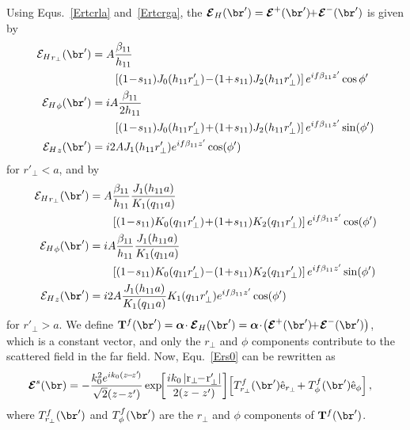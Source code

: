 Using Equs.~\ref{Ertcrla} and~\ref{Ertcrga}, the $ \boldsymbol{\mathcal{E}}_H (\br')= \boldsymbol{\mathcal{E}}^+ (\br') \!\! +\! \boldsymbol{\mathcal{E}}^- (\br') $ is given by
\begin{subequations}
\label{EHrcrla}
\begin{align}
{\mathcal{E}_H}_{r_\perp} (\br') &= A\frac{\beta_{11}}{h_{11}}\nonumber\\
&\qquad \left[ (1\!-\!s_{11})J_0(h_{11}r'_\perp)\!-\! (1\!+\!s_{11})J_2(h_{11}r_\perp') \right]e^{if\beta_{11} z'}\cos{\phi'}\\
{\mathcal{E}_H}_\phi(\br') &=  iA \frac{\beta_{11}}{2h_{11}} \nonumber\\
&\qquad \left[ (1\!-\!s_{11})J_0(h_{11}r'_\perp)\! +\! (1\!+\!s_{11})J_2(h_{11}r'_\perp) \right] e^{if\beta_{11} z' }\sin(\phi')\\
{\mathcal{E}_H}_z(\br') &= i2A J_1(h_{11}r'_\perp) e^{if\beta_{11} z'}\cos(\phi')
\end{align}
\end{subequations}
for $ r'_\perp<a $, and by
\begin{subequations}
\label{EHrpcrga}
\begin{align}
{\mathcal{E}_H}_{r_\perp}(\br') &=A\frac{\beta_{11}}{h_{11}}\frac{J_1(h_{11}a)}{K_1(q_{11}a)}\nonumber\\ 
&\qquad \left[ (1\!-\!s_{11})K_0(q_{11}r'_\perp)\!+\!(1 \!+\! s_{11})K_2(q_{11}r'_\perp) \right]e^{if\beta_{11} z' }\cos(\phi')\\
{\mathcal{E}_H}_\phi(\br') &=  iA \frac{\beta_{11}}{h_{11}} \frac{J_1(h_{11}a)}{K_1(q_{11}a)}\nonumber\\ 
&\qquad \left[ (1\!-\!s_{11})K_0(q_{11}r'_\perp) \! -\! (1\!+\!s_{11})K_2(q_{11}r'_\perp) \right] e^{if\beta_{11} z'}\sin(\phi')\\
{\mathcal{E}_H}_z(\br') &= i2A \frac{J_1(h_{11}a)}{K_1(q_{11}a)} K_1(q_{11}r'_\perp) e^{if\beta_{11} z'}\cos(\phi')
\end{align}
\end{subequations}
for $ r'_\perp>a $. We define $ \mathbf{T}^{f}(\br')= \boldsymbol{\alpha}\!\cdot \boldsymbol{\mathcal{E}}_H (\br') = \boldsymbol{\alpha}\!\cdot\! \left(\boldsymbol{\mathcal{E}}^+ (\br') \!\! +\! \boldsymbol{\mathcal{E}}^- (\br') \right) $, which is a constant vector, and only the $ r_\perp $ and $ \phi $ components contribute to the scattered field in the far field. Now, Equ.~\ref{Ers0} can be rewritten as
\begin{align}
\boldsymbol{\mathcal{E}}^s(\br) &=- \frac{k_0^2 e^{ik_0(z\!-\!z'\!)}}{\sqrt{2}(z\!-\!z')} \exp\!\! \left[ \frac{ik_0 \left| \mathrm{r}_\perp\!\! -\! \mathrm{r}_\perp'\right|}{2(z-z')}  \right]\! \left[ T_{r_\perp}^f(\br') \hat{\mathrm{e}}_{r_\perp} \! + T^f_\phi (\br') \hat{\mathrm{e}}_{\phi} \right],
\end{align}
where $ T^f_{r_\perp}(\br') $ and $ T^f_\phi (\br') $ are the $ r_\perp $ and $ \phi $ components of $ \mathbf{T}^f(\br')$. 

